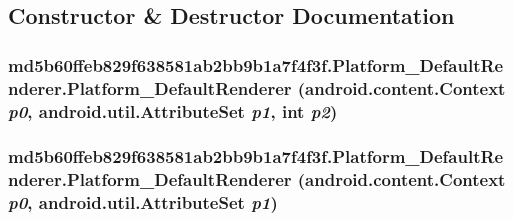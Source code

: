 \subsection{Constructor \& Destructor Documentation}
\hypertarget{classmd5b60ffeb829f638581ab2bb9b1a7f4f3f_1_1_platform___default_renderer_eafd2a9469465843c186a31ab7c6f1fa}{
\subsubsection[{Platform\_\-DefaultRenderer}]{\setlength{\rightskip}{0pt plus 5cm}md5b60ffeb829f638581ab2bb9b1a7f4f3f.Platform\_\-DefaultRenderer.Platform\_\-DefaultRenderer (android.content.Context {\em p0}, \/  android.util.AttributeSet {\em p1}, \/  int {\em p2})}}
\label{classmd5b60ffeb829f638581ab2bb9b1a7f4f3f_1_1_platform___default_renderer_eafd2a9469465843c186a31ab7c6f1fa}


\hypertarget{classmd5b60ffeb829f638581ab2bb9b1a7f4f3f_1_1_platform___default_renderer_bbbf33e1c50423f6b442efed5224ebec}{
\subsubsection[{Platform\_\-DefaultRenderer}]{\setlength{\rightskip}{0pt plus 5cm}md5b60ffeb829f638581ab2bb9b1a7f4f3f.Platform\_\-DefaultRenderer.Platform\_\-DefaultRenderer (android.content.Context {\em p0}, \/  android.util.AttributeSet {\em p1})}}
\label{classmd5b60ffeb829f638581ab2bb9b1a7f4f3f_1_1_platform___default_renderer_bbbf33e1c50423f6b442efed5224ebec}


